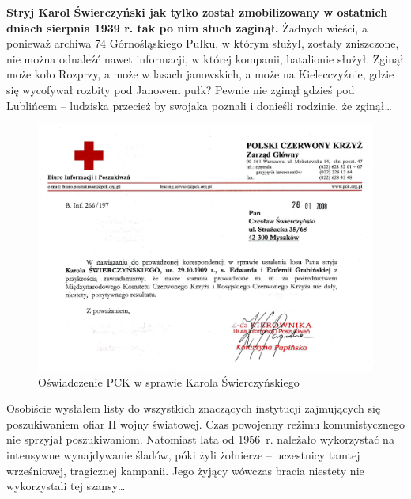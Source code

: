 \textbf{Stryj Karol Świerczyński jak tylko został zmobilizowany w ostatnich dniach sierpnia 1939 r. tak po nim słuch zaginął.} Żadnych wieści, a ponieważ archiwa 74 Górnośląskiego Pułku, w którym służył, zostały zniszczone, nie można odnaleźć nawet informacji, w której kompanii, batalionie służył. Zginął może koło Rozprzy, a może w lasach janowskich, a może na Kielecczyźnie, gdzie się wycofywał rozbity pod Janowem pułk? Pewnie nie zginął gdzieś pod Lublińcem – ludziska przecież by swojaka poznali i donieśli rodzinie, że zginął\ldots

\begin{figure}[!h]
\begin{center}
\includegraphics[width=\textwidth]{photo/karol_swierczynski_pck.jpg}
\caption{Oświadczenie PCK w sprawie Karola Świerczyńskiego}
\label{rys:karol_swierczynski_pck}
\end{center}
\end{figure}

Osobiście wysłałem listy do wszystkich znaczących instytucji zajmujących się poszukiwaniem ofiar II wojny światowej. Czas powojenny reżimu komunistycznego nie sprzyjał poszukiwaniom. Natomiast lata od 1956~r. należało wykorzystać na intensywne wynajdywanie śladów, póki żyli żołnierze -- uczestnicy tamtej wrześniowej, tragicznej kampanii. Jego żyjący wówczas bracia niestety nie wykorzystali tej szansy\ldots